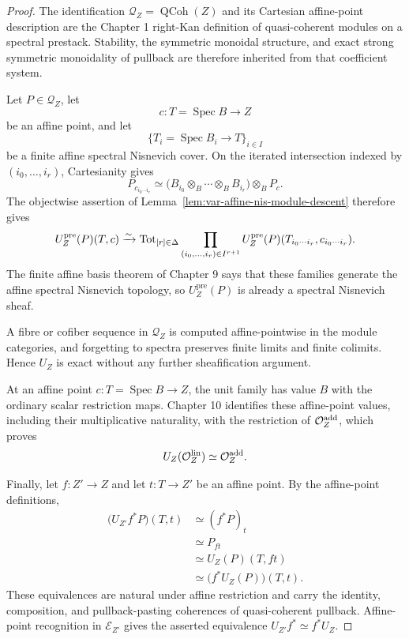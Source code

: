 \begin{proof}
The identification \(\mathcal Q_Z=\operatorname{QCoh}(Z)\) and its Cartesian affine-point description are the Chapter 1 right-Kan definition of quasi-coherent modules on a spectral prestack.  Stability, the symmetric monoidal structure, and exact strong symmetric monoidality of pullback are therefore inherited from that coefficient system.

Let \(P\in\mathcal Q_Z\), let
\[
    c:T=\operatorname{Spec}B\longrightarrow Z
\]
be an affine point, and let
\[
    \{T_i=\operatorname{Spec}B_i\longrightarrow T\}_{i\in I}
\]
be a finite affine spectral Nisnevich cover.  On the iterated intersection indexed by \((i_0,\ldots,i_r)\), Cartesianity gives
\[
    P_{c_{i_0\cdots i_r}}
    \simeq
    \bigl(B_{i_0}\otimes_B\cdots\otimes_BB_{i_r}\bigr)\otimes_BP_c.
\]
The objectwise assertion of Lemma~\ref{lem:var-affine-nis-module-descent} therefore gives
\[
    U_Z^{\mathrm{pre}}(P)(T,c)
    \xrightarrow{\sim}
    \operatorname{Tot}_{[r]\in\Delta}
    \prod_{(i_0,\ldots,i_r)\in I^{r+1}}
    U_Z^{\mathrm{pre}}(P)(T_{i_0\cdots i_r},c_{i_0\cdots i_r}).
\]
The finite affine basis theorem of Chapter 9 says that these families generate the affine spectral Nisnevich topology, so \(U_Z^{\mathrm{pre}}(P)\) is already a spectral Nisnevich sheaf.

A fibre or cofiber sequence in \(\mathcal Q_Z\) is computed affine-pointwise in the module categories, and forgetting to spectra preserves finite limits and finite colimits.  Hence \(U_Z\) is exact without any further sheafification argument.

At an affine point \(c:T=\operatorname{Spec}B\to Z\), the unit family has value \(B\) with the ordinary scalar restriction maps.  Chapter 10 identifies these affine-point values, including their multiplicative naturality, with the restriction of \(\mathcal O^{\mathrm{add}}_Z\), which proves
\[
    U_Z(\mathcal O_Z^{\mathrm{lin}})\simeq\mathcal O^{\mathrm{add}}_Z.
\]

Finally, let \(f:Z'\to Z\) and let \(t:T\to Z'\) be an affine point.  By the affine-point definitions,
\[
\begin{aligned}
    \bigl(U_{Z'}f^*P\bigr)(T,t)
    &\simeq
    (f^*P)_t\\
    &\simeq
    P_{ft}\\
    &\simeq
    U_Z(P)(T,ft)\\
    &\simeq
    \bigl(f^*U_Z(P)\bigr)(T,t).
\end{aligned}
\]
These equivalences are natural under affine restriction and carry the identity, composition, and pullback-pasting coherences of quasi-coherent pullback.  Affine-point recognition in \(\mathcal E_{Z'}\) gives the asserted equivalence \(U_{Z'}f^*\simeq f^*U_Z\).
\end{proof}

